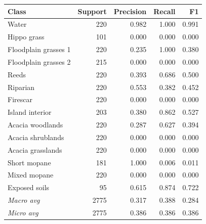 \begin{tabular}{lrrrr}
\toprule
Class & Support & Precision & Recall & F1 \\
\midrule
Water & 220 & 0.982 & 1.000 & 0.991 \\
Hippo grass & 101 & 0.000 & 0.000 & 0.000 \\
Floodplain grasses 1 & 220 & 0.235 & 1.000 & 0.380 \\
Floodplain grasses 2 & 215 & 0.000 & 0.000 & 0.000 \\
Reeds & 220 & 0.393 & 0.686 & 0.500 \\
Riparian & 220 & 0.553 & 0.382 & 0.452 \\
Firescar & 220 & 0.000 & 0.000 & 0.000 \\
Island interior & 203 & 0.380 & 0.862 & 0.527 \\
Acacia woodlands & 220 & 0.287 & 0.627 & 0.394 \\
Acacia shrublands & 220 & 0.000 & 0.000 & 0.000 \\
Acacia grasslands & 220 & 0.000 & 0.000 & 0.000 \\
Short mopane & 181 & 1.000 & 0.006 & 0.011 \\
Mixed mopane & 220 & 0.000 & 0.000 & 0.000 \\
Exposed soils & 95 & 0.615 & 0.874 & 0.722 \\
\midrule
\textit{Macro avg} & 2775 & 0.317 & 0.388 & 0.284 \\
\textit{Micro avg} & 2775 & 0.386 & 0.386 & 0.386 \\
\bottomrule
\end{tabular}
